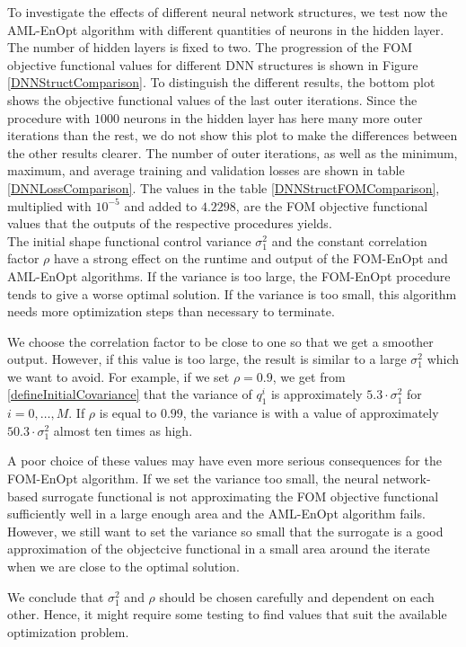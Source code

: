 To investigate the effects of different neural network structures, we test now the AML-EnOpt algorithm with different quantities of neurons in the hidden layer. The number of hidden layers is fixed to two. The progression of the FOM objective functional values for different DNN structures is shown in Figure \ref{DNNStructComparison}. To distinguish the different results, the bottom plot shows the objective functional values of the last outer iterations. Since the procedure with $1000$ neurons in the hidden layer has here many more outer iterations than the rest, we do not show this plot to make the differences between the other results clearer. The number of outer iterations, as well as the minimum, maximum, and average training and validation losses are shown in table \ref{DNNLossComparison}. The values in the table \ref{DNNStructFOMComparison}, multiplied with $10^{-5}$ and added to $4.2298$, are the FOM objective functional values that the outputs of the respective procedures yields.\\

The initial shape functional control variance $\sigma^2_1$ and the constant correlation factor $\rho$ have a strong effect on the runtime and output of the FOM-EnOpt and AML-EnOpt algorithms. If the variance is too large, the FOM-EnOpt procedure tends to give a worse optimal solution. If the variance is too small, this algorithm needs more optimization steps than necessary to terminate.

We choose the correlation factor to be close to one so that we get a smoother output. However, if this value is too large, the result is similar to a large $\sigma^2_1$ which we want to avoid. For example, if we set $\rho=0.9$, we get from \eqref{defineInitialCovariance} that the variance of $q^i_1$ is approximately $5.3\cdot\sigma^2_1$ for $i=0,\dotsc,M$. If $\rho$ is equal to $0.99$, the variance is with a value of approximately $50.3\cdot\sigma^2_1$ almost ten times as high.

A poor choice of these values may have even more serious consequences for the FOM-EnOpt algorithm. If we set the variance too small, the neural network-based surrogate functional is not approximating the FOM objective functional sufficiently well in a large enough area and the AML-EnOpt algorithm fails. However, we still want to set the variance so small that the surrogate is a good approximation of the objectcive functional in a small area around the iterate when we are close to the optimal solution.

We conclude that $\sigma^2_1$ and $\rho$ should be chosen carefully and dependent on each other. Hence, it might require some testing to find values that suit the available optimization problem.\\


